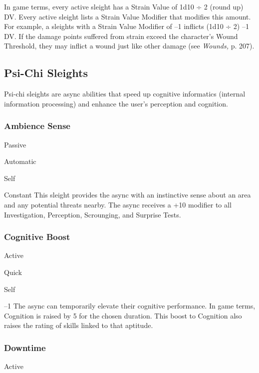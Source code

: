 In game terms, every active sleight has a Strain 
Value of 1d10 ÷ 2 (round up) DV. Every active sleight 
lists a Strain Value Modifier that modifies this amount. 
For example, a sleights with a Strain Value Modifier 
of –1 inflicts (1d10 ÷ 2) –1 DV.
If the damage points suffered from strain exceed 
the character's Wound Threshold, they may inflict a 
wound just like other damage (see \textit{Wounds,} p. 207).

\subsection{Psi-Chi Sleights}

Psi-chi sleights are async abilities that speed up cognitive
informatics (internal information processing) and
enhance the user's perception and cognition.

\subsubsection{Ambience Sense}


  

Passive

   Automatic

 Self

   Constant
This sleight provides the async with an instinctive 
sense about an area and any potential threats nearby. 
The async receives a +10 modifier to all Investigation, 
Perception, Scrounging, and Surprise Tests.

\subsubsection{Cognitive Boost}


  

Active

   Quick

 Self

  

   –1
The async can temporarily elevate their cognitive 
performance. In game terms, Cognition is raised by 5 
for the chosen duration. This boost to Cognition also 
raises the rating of skills linked to that aptitude.

\subsubsection{Downtime}

  

Active

